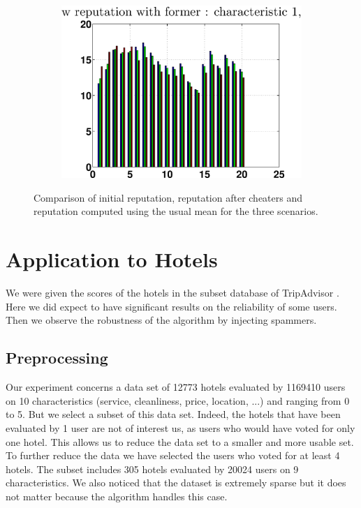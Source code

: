 \documentclass[12pt,a4paper]{article}
\begin{document}
\begin{figure}[!ht]
\begin{subfigure}[b]{0.32\textwidth}
\end{subfigure}
\begin{subfigure}[b]{0.32\textwidth}
\includegraphics[width = \textwidth]{cheaters/chcompareRepMixc1.eps}
\end{subfigure}
\caption{\label{finalCheat}Comparison of initial reputation, reputation after cheaters and reputation computed using the usual mean for the three scenarios.}
\end{figure}

\clearpage
\section{Application to Hotels}

We were given the scores of the hotels in the subset database of TripAdvisor \cite{TripAdvisor}. Here we did  expect to have significant results on the reliability of some users. Then we observe the robustness of the algorithm by injecting spammers.

\subsection{Preprocessing}
Our experiment concerns a data set of 12773 hotels evaluated by 1169410 users on 10 characteristics (service, cleanliness, price, location, ...) and ranging from 0 to 5. But we select a subset of this data set. Indeed, the hotels that have been evaluated by 1 user are not of interest us, as users who would have voted for only one hotel. This allows us to reduce the data set to a smaller and more usable set. To further reduce the data we have selected the users who voted for at least 4 hotels. The subset includes 305 hotels evaluated by 20024 users on 9 characteristics. We also noticed that the dataset is extremely sparse but it does not matter because the algorithm handles this case.
\end{document}
